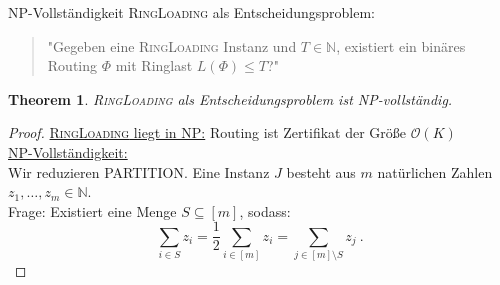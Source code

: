 \documentclass[8pt]{beamer}
\newcommand{\cO}{\mathcal{O}}
\newcommand{\N}{\mathbb{N}}
\newcommand{\RL}{\textsc{RingLoading}\xspace}
\theoremstyle{claim}
\newtheorem{mytheorem}[theorem]{Theorem}
\begin{document}
	\begin{frame}{NP-Vollständigkeit}
		\RL als Entscheidungsproblem:
		\begin{quote}
			"Gegeben eine \RL Instanz und $T \in \N$, existiert ein binäres Routing $\Phi$ mit Ringlast $L(\Phi) \leq T$?"
		\end{quote}\pause
		\begin{mytheorem}
			\RL als Entscheidungsproblem ist NP-vollständig.
		\end{mytheorem}\pause
		\begin{proof}\let\qed\relax
			\underline{\RL liegt in NP:} Routing ist Zertifikat der Größe $\cO(K)$\\\pause
			\underline{NP-Vollständigkeit:}\\
			Wir reduzieren \textsc{PARTITION}.
		    Eine Instanz $J$ besteht aus $m$ natürlichen Zahlen $z_1, \ldots, z_m \in \N$.\\
		    Frage: Existiert eine Menge $S \subseteq [m]$, sodass:
			\begin{equation}
				\sum_{i \in S} z_i = \frac{1}{2} \sum_{i \in [m]} z_i = \sum_{j \in [m] \setminus S} z_j\ .
			\end{equation}
		\end{proof}
	\end{frame}
\end{document}

